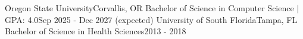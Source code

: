 \resumeSubHeadingListStart
  \resumeSubheading
    {Oregon State University}{Corvallis, OR}
    {Bachelor of Science in Computer Science $|$ GPA: 4.0}{Sep 2025 - Dec 2027 (expected)}
    \vspace{-1pt}
    \resumeItemListStart
    \resumeItemListEnd
    \vspace{2pt}
  \resumeSubheading
    {University of South Florida}{Tampa, FL}
    {Bachelor of Science in Health Sciences}{2013 - 2018}
    \vspace{-1pt}
\resumeSubHeadingListEnd